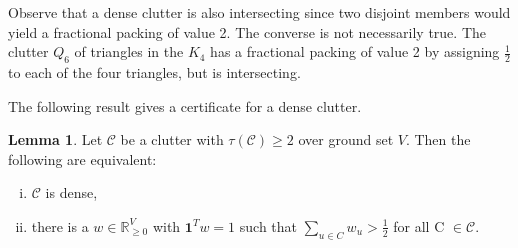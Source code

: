 \documentclass[a4paper, 12pt, twoside=false]{scrbook}
\theoremstyle{definition}
\newtheorem{lemma}[theorem]{Lemma}
\newcommand*{\IR}{\ensuremath{\mathbb{R}}}
\begin{document}
Observe that a dense clutter is also intersecting since two disjoint members would yield a fractional packing of value 2.
The converse is not necessarily true.
The clutter $Q_6$ of triangles in the $K_4$ has a fractional packing of value 2 by assigning $\frac 12$ to each of the four triangles, but is intersecting.

The following result gives a certificate for a dense clutter.
\begin{lemma}\label{certificate}
    Let $\mathcal{C}$ be a clutter with $\tau(\mathcal{C})\geq 2$ over ground set $V$.
    Then the following are equivalent:
    \leavevmode
    \begin{enumerate}[(i)]
        \item $\mathcal{C}$ is dense,
        \item there is a $w \in \IR_{\geq 0}^V$ with $\textbf{1}^Tw=1$ such that $\sum_{u \in C} w_u > \frac 12$ for all C $\in \mathcal{C}$.
    \end{enumerate}
\end{lemma}
\end{document}
